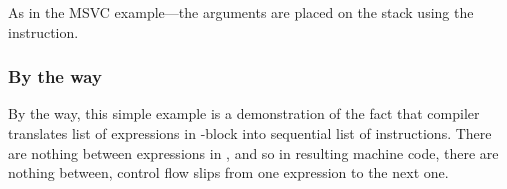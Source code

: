As in the MSVC example---the arguments are placed on the stack using the \MOV instruction.
\fi

\subsubsection{By the way}

By the way, this simple example is a demonstration of the fact that compiler translates
list of expressions in \CCpp-block into sequential list of instructions.
There are nothing between expressions in \CCpp, and so in resulting machine code, 
there are nothing between, control flow slips from one expression to the next one.

